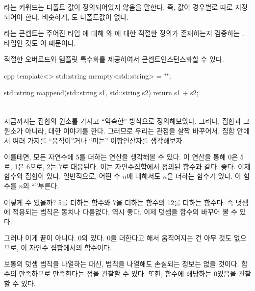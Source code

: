 라는 키워드는 디폴트 값이 정의되어있지 않음을 말한다. 
즉, 값이 경우별로 따로 지정되어야 한다.
비슷하게, 도 디폴트값이 없다.

라는 콘셉트는
주어진 타입 에 대해 와 에 대한 적절한 정의가 존재하는지 검증하는 .
 타입인 것도 이 때문이다.

적절한 오버로드와 템플릿 특수화를 제공하여서 \trMonoid 콘셉트\를 인스턴스화할 수 있다.

\begin{snip}{cpp}
template<>
std::string mempty<std::string> = {""};

std::string mappend(std::string s1, std::string s2) { 
    return s1 + s2;
}
\end{snip}

\section{\trCategory{} \trMonoid }

지금까지는 집합의 원소룰 가지고 ``익숙한'' 방식으로 \trMonoid\를 정의해보았다. 
그러나,  집합과 그 원소가 아니라, \trObject\와  대한 이야기를 한다.
그러므로 우리는 관점을 살짝 바꾸어서, 집합 안에서 여러 가지를 ``움직이''거나 ``미는'' 이항연산자를 생각해보자.

이를테면, 모든 자연수에 5를 더하는 연산을 생각해볼 수 있다. 이 연산을 통해 0은 5로, 1은 6으로, 2는 7로 대응된다.
이는 자연수집합에서 정의된 함수과 같다. 좋다. 이제 함수와 집합이 있다. 
일반적으로, 어떤 수 $n$에 대해서도 $n$을 더하는 함수가 있다. 이 함수를 $n$의 ``\trAdder'' 부른다.

\trAdder\는 어떻게  수 있을까? 5를 더하는 함수와 7을 더하는 함수의 \trComposition\은 12를 더하는 함수다.
즉  \trComposition\과 덧셈에 적용되는 법칙은 동치나 다름없다. 역시 좋다. 이제 덧셈을 함수의 \trComposition\로 바꾸어 볼 수 있다.

그러나 이게 끝이 아니다.  0의  있다. 0을 더한다고 해서 움직여지는 건 아무 것도 없으므로,
이 \trAdder\은 자연수 집합에서의 \trIdentity 함수이다.

보통의 덧셈 법칙을 나열하는 대신,  법칙을 나열해도 손실되는 정보는 없을 것이다.
함수의 \trComposition\이 \trAssociativity\를 만족하므로   \trAssociativity\을 만족한다는 점을 관찰할 수 있다.
또한, \trIdentity 함수에 해당하는 0 있음을 관찰할 수 있다.

